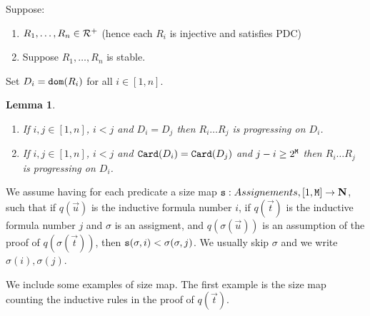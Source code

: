 \documentclass{lmcs}
\newtheorem{lemma}[theorem]{Lemma}
\begin{document}
Suppose:
\begin{enumerate}
\item
$R_1, \ldots, R_n \in {\mathcal R}^+$ (hence each $R_i$ is injective and satisfies PDC) 
\item
Suppose $R_1, \ldots, R_n$ is stable. 
\end{enumerate}
Set $D_i = {\tt dom}(R_i)$ for all $i \in [1,n]$.


\begin{lemma}
\begin{enumerate}
\item
If $i,j \in [1,n]$, $i<j$ and $D_i = D_j$ then $R_i \ldots R_j$ is progressing on $D_i$.
\item
If  $i,j \in [1,n]$, $i<j$ and ${\tt Card}(D_i) = {\tt Card}(D_j)$ and $j-i \ge 2^{{\tt M}}$ 
then $R_i \ldots R_j$ is progressing on $D_i$.
\end{enumerate}
\end{lemma}

We assume having for each predicate a size map ${\tt s} : Assignements, 
[1,{\tt M}] \rightarrow {\bf N}$,
such that if $q(\vec{u})$ is the inductive formula number $i$, if $q(\vec{t})$ is the inductive
formula number $j$ and $\sigma$ is an assigment, and $q(\sigma(\vec{u}))$ is an assumption
of the proof of $q(\sigma(\vec{t}))$, then ${\tt s}(\sigma,i) < \sigma(\sigma,j)$. We usually 
skip $\sigma$ and we write $\sigma(i), \sigma(j)$.

We include some examples of size map. The first example is the size map counting the
inductive rules in the proof of $q(\vec{t})$.
\end{document}
